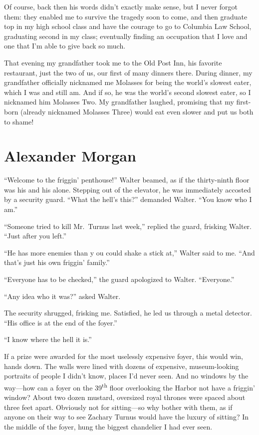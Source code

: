 Of course, back then his words didn't exactly make sense, but I never
forgot them: they enabled me to survive the tragedy soon to come, and
then graduate top in my high school class and have the courage to go to
Columbia Law School, graduating second in my class; eventually finding
an occupation that I love and one that I'm able to give back so much.

That evening my grandfather took me to the Old Post Inn, his favorite
restaurant, just the two of us, our first of many dinners there. During
dinner, my grandfather officially nicknamed me Molasses for being the
world's slowest eater, which I was and still am. And if so, he was the
world's second slowest eater, so I nicknamed him Molasses Two. My
grandfather laughed, promising that my first-born (already nicknamed
Molasses Three) would eat even slower and put us both to shame!

\chapter{Alexander Morgan}

\titlemark

``Welcome to the friggin' penthouse!'' Walter beamed, as if the
thirty-ninth floor was his and his alone. Stepping out of the elevator,
he was immediately accosted by a security guard. ``What the hell's
this?'' demanded Walter. ``You know who I am.''

``Someone tried to kill Mr.~Turnus last week,'' replied the guard,
frisking Walter. ``Just after you left.''

``He has more enemies than y ou could shake a stick at,'' Walter said to
me. ``And that's just his own friggin' family.''

``Everyone has to be checked,'' the guard apologized to Walter.
``Everyone.''

``Any idea who it was?'' asked Walter.

The security shrugged, frisking me. Satisfied, he led us through a metal
detector. ``His office is at the end of the foyer.''

``I know where the hell it is.''

If a prize were awarded for the most uselessly expensive foyer, this
would win, hands down. The walls were lined with dozens of expensive,
museum-looking portraits of people I didn't know, places I'd never seen.
And no windows by the way---how can a foyer on the
39\textsuperscript{th} floor overlooking the Harbor not have a friggin'
window? About two dozen mustard, oversized royal thrones were spaced
about three feet apart. Obviously not for sitting---so why bother with
them, as if anyone on their way to see Zachary Turnus would have the
luxury of sitting? In the middle of the foyer, hung the biggest
chandelier I had ever seen.

